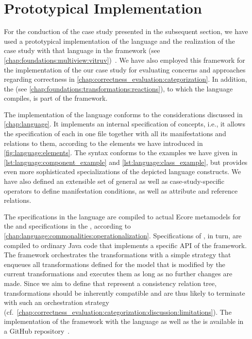 \section{Prototypical Implementation}

For the conduction of the case study presented in the subsequent section, we have used a prototypical implementation of the \commonalities language and the realization of the case study with that language in the \vitruv framework (see \autoref{chap:foundations:multiview:vitruv})~.
We have also employed this framework for the implementation of the our case study for evaluating concerns and approaches regarding correctness in \autoref{chap:correctness_evaluation:categorization}.
In addition, the \reactionslanguage (see \autoref{chap:foundations:transformations:reactions}), to which the \commonalities language compiles, is part of the \vitruv framework.

The implementation of the \commonalities language conforms to the considerations discussed in \autoref{chap:language}.
It implements an internal specification of concepts, i.e., it allows the specification of each \commonality in one file together with all its manifestations and relations to them, according to the elements we have introduced in \autoref{fig:language:elements}.
The syntax conforms to the examples we have given in \autoref{lst:language:component_example} and \autoref{lst:language:class_example}, but provides even more sophisticated specializations of the depicted language constructs.
We have also defined an extensible set of general as well as case-study-specific operators to define manifestation conditions, as well as attribute and reference relations.

The specifications in the \commonalities language are compiled to actual Ecore metamodels for the \conceptmetamodels and specifications in the \reactionslanguage, according to \autoref{chap:language:commonalities:operationalization}.
Specifications of \reactions, in turn, are compiled to ordinary Java code that implements a specific \gls{API} of the \vitruv framework.
The framework orchestrates the transformations with a simple strategy that enqueues all transformations defined for the model that is modified by the current transformations and executes them as long as no further changes are made.
Since we aim to define \commonalities that represent a consistency relation tree, transformations should be inherently compatible and are thus likely to terminate with such an orchestration strategy (cf.~\autoref{chap:correctness_evaluation:categorization:discussion:limitations}).
The implementation of the framework with the \commonalities language as well as the \reactionslanguage is available in a GitHub repository~.



